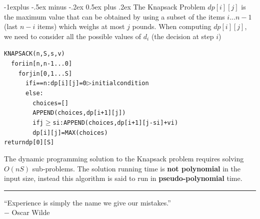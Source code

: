 \documentclass[10pt,landscape]{article}
\makeatletter
\renewcommand{\subsection}{\@startsection{subsection}{2}{0mm}%
                                {-1explus -.5ex minus -.2ex}%
                                {0.5ex plus .2ex}%
                                {\normalfont\normalsize\bfseries}}
\makeatother
\begin{document}
\begin{multicols}{3}
\subsection{The Knapsack Problem}
$dp[i][j]$ is the maximum value that can be obtained by using a subset of the items $i ...n-1$ (last $n-i$ items) which weighs at most $j$ pounds. When computing $dp[i][j]$, we need to consider all the possible values of $d_i$ (the decision at step $i$) \\
\begin{alltt}
KNAPSACK(n, S, s, v) 
\ \	for i in [n,n-1...0]
\ \	\ \	for j in [0, 1 . . . S]
\ \	\ \	\ \	if i == n: dp[i][j] = 0 \(\rhd\) initial condition 
\ \	\ \	\ \	else:
\ \	\ \	\ \	\ \	choices = [] 
\ \	\ \	\ \	\ \	APPEND(choices, dp[i + 1][j]) 
\ \	\ \	\ \	\ \	if j \(\ge\) si: APPEND(choices, dp[i + 1][j - si] + vi) 
\ \	\ \	\ \	\ \	dp[i][j] = MAX(choices) 
return dp[0][S]
\end{alltt}
The dynamic programming solution to the Knapsack problem requires solving $O(nS)$ sub-problems. The solution running time is \textbf{not polynomial} in the input size, instead this algorithm is said to run in \textbf{pseudo-polynomial} time.

\rule{0.3\linewidth}{0.25pt}
\scriptsize

“Experience is simply the name we give our mistakes.” \\
 $-$ Oscar Wilde



\end{multicols}
\end{document}
